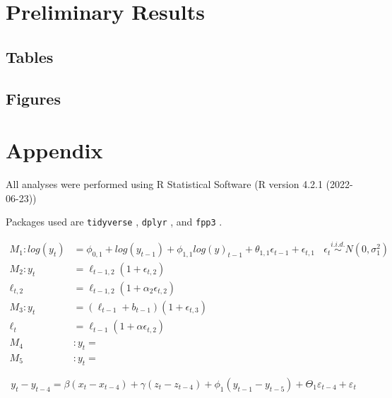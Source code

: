 \documentclass{monashthesis}
\begin{document}
\hypertarget{preliminary-results}{%
\chapter{Preliminary Results}\label{preliminary-results}}

\hypertarget{tables}{%
\section{Tables}\label{tables}}

\hypertarget{figures}{%
\section{Figures}\label{figures}}

\appendix

\hypertarget{appendix}{%
\chapter{Appendix}\label{appendix}}

All analyses were performed using R Statistical Software (R version 4.2.1 (2022-06-23))

Packages used are \texttt{tidyverse} \autocite{tidy19}, \texttt{dplyr} \autocite{dplyr23}, and \texttt{fpp3} \autocite{fpp23}.

\[\begin{aligned}
M_1: log(y_t) &= \phi_{0,1} + log(y_{t-1}) + \phi_{1,1}log(y)_{t-1} + \theta_{1,1}\epsilon_{t-1} + \epsilon_{t,1} \ \ \ \ \epsilon_t \stackrel{i.i.d.}{\sim} N(0,\sigma_1^2) \\
M_2: y_t &= \ell_{t-1,2}(1+\epsilon_{t,2}) \\
  \ell_{t,2} &= \ell_{t-1,2}(1+\alpha_2\epsilon_{t,2}) \\
M_3: y_t &= (\ell_{t-1}+b_{t-1}) (1+\epsilon_{t,3}) \\
  \ell_t &= \ell_{t-1}(1+\alpha\epsilon_{t,2}) \\
M_4&: y_t = \\
M_5&: y_t = 
\end{aligned}\]

\begin{equation}
  y_t - y_{t-4} = \beta (x_t-x_{t-4}) + \gamma (z_t-z_{t-4}) + \phi_1 (y_{t-1} - y_{t-5}) + \Theta_1 \varepsilon_{t-4} + \varepsilon_t
\end{equation}

\textcite{fpp3}

\printbibliography[title={Reference}]
\end{document}
